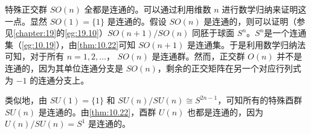 特殊正交群 $SO(n)$ 全都是连通的。可以通过利用维数 $n$ 进行数学归纳来证明这一点。显然 $SO(1)=\{1\}$ 是连通的。假设 $SO(n)$ 是连通的，则可以证明（参见\ref{chapter:19}的\ref{eg:19.10}）$SO(n+1)/SO(n)$ 同胚于球面 $S^{n}$。$S^{n}$是一个连通集（\ref{eg:10.19}），由\ref{thm:10.22}可知 $ SO(n+1)$ 是连通集。于是利用数学归纳法可知，对于所有 $n=1,2,\dotsc $， $ SO(n)$ 是连通群。然而，正交群 $O(n)$ 并不是连通的，因为其单位连通分支是 $SO(n)$，剩余的正交矩阵在另一个对应行列式为 $ -1$ 的连通分支上。

类似地，由 $SU(1)=\{1\}$ 和 $SU(n)/SU(n)\cong S^{2n-1}$，可知所有的特殊酉群 $SU(n)$ 是连通的。由\ref{thm:10.22}，酉群 $U(n)$ 也都是连通的，因为 $U(n)/SU(n)=S^{1}$ 是连通的。